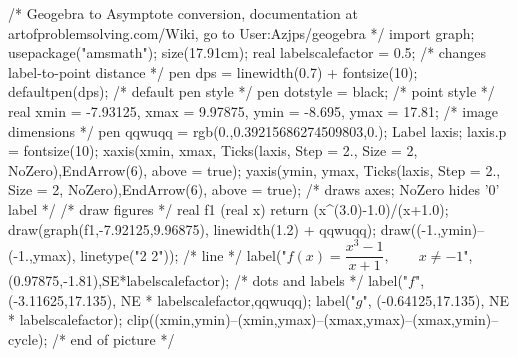  /* Geogebra to Asymptote conversion, documentation at artofproblemsolving.com/Wiki, go to User:Azjps/geogebra */
import graph; usepackage("amsmath"); size(17.91cm); 
real labelscalefactor = 0.5; /* changes label-to-point distance */
pen dps = linewidth(0.7) + fontsize(10); defaultpen(dps); /* default pen style */ 
pen dotstyle = black; /* point style */ 
real xmin = -7.93125, xmax = 9.97875, ymin = -8.695, ymax = 17.81;  /* image dimensions */
pen qqwuqq = rgb(0.,0.39215686274509803,0.); 
Label laxis; laxis.p = fontsize(10); 
xaxis(xmin, xmax, Ticks(laxis, Step = 2., Size = 2, NoZero),EndArrow(6), above = true); 
yaxis(ymin, ymax, Ticks(laxis, Step = 2., Size = 2, NoZero),EndArrow(6), above = true); /* draws axes; NoZero hides '0' label */ 
 /* draw figures */
real f1 (real x) {return (x^(3.0)-1.0)/(x+1.0);} 
draw(graph(f1,-7.92125,9.96875), linewidth(1.2) + qqwuqq); 
draw((-1.,ymin)--(-1.,ymax), linetype("2 2")); /* line */
label("$f(x)=\dfrac{x^3-1}{x+1}, \qquad x\neq -1$",(0.97875,-1.81),SE*labelscalefactor); 
 /* dots and labels */
label("$f$", (-3.11625,17.135), NE * labelscalefactor,qqwuqq); 
label("$g$", (-0.64125,17.135), NE * labelscalefactor); 
clip((xmin,ymin)--(xmin,ymax)--(xmax,ymax)--(xmax,ymin)--cycle); 
 /* end of picture */